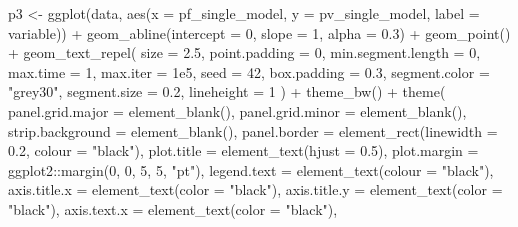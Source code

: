 \documentclass[
  11pt,
  oneside]{book}
\newenvironment{Shaded}{\begin{snugshade}}{\end{snugshade}}
\newcommand{\AttributeTok}[1]{\textcolor[rgb]{0.77,0.63,0.00}{#1}}
\newcommand{\DecValTok}[1]{\textcolor[rgb]{0.00,0.00,0.81}{#1}}
\newcommand{\FloatTok}[1]{\textcolor[rgb]{0.00,0.00,0.81}{#1}}
\newcommand{\FunctionTok}[1]{\textcolor[rgb]{0.00,0.00,0.00}{#1}}
\newcommand{\NormalTok}[1]{#1}
\newcommand{\OtherTok}[1]{\textcolor[rgb]{0.56,0.35,0.01}{#1}}
\newcommand{\SpecialCharTok}[1]{\textcolor[rgb]{0.00,0.00,0.00}{#1}}
\newcommand{\StringTok}[1]{\textcolor[rgb]{0.31,0.60,0.02}{#1}}
\begin{document}
\begin{Shaded}
\begin{Highlighting}[]
\NormalTok{p3 }\OtherTok{\textless{}{-}} \FunctionTok{ggplot}\NormalTok{(data, }\FunctionTok{aes}\NormalTok{(}\AttributeTok{x =}\NormalTok{ pf\_single\_model, }\AttributeTok{y =}\NormalTok{ pv\_single\_model, }\AttributeTok{label =}\NormalTok{ variable)) }\SpecialCharTok{+}
  \FunctionTok{geom\_abline}\NormalTok{(}\AttributeTok{intercept =} \DecValTok{0}\NormalTok{, }\AttributeTok{slope =} \DecValTok{1}\NormalTok{, }\AttributeTok{alpha =} \FloatTok{0.3}\NormalTok{) }\SpecialCharTok{+}
  \FunctionTok{geom\_point}\NormalTok{() }\SpecialCharTok{+}
  \FunctionTok{geom\_text\_repel}\NormalTok{(}
    \AttributeTok{size =} \FloatTok{2.5}\NormalTok{, }\AttributeTok{point.padding =} \DecValTok{0}\NormalTok{, }\AttributeTok{min.segment.length =} \DecValTok{0}\NormalTok{,}
    \AttributeTok{max.time =} \DecValTok{1}\NormalTok{, }\AttributeTok{max.iter =} \FloatTok{1e5}\NormalTok{, }\AttributeTok{seed =} \DecValTok{42}\NormalTok{, }\AttributeTok{box.padding =} \FloatTok{0.3}\NormalTok{,}
    \AttributeTok{segment.color =} \StringTok{"grey30"}\NormalTok{, }\AttributeTok{segment.size =} \FloatTok{0.2}\NormalTok{, }\AttributeTok{lineheight =} \DecValTok{1}
\NormalTok{  ) }\SpecialCharTok{+}
  \FunctionTok{theme\_bw}\NormalTok{() }\SpecialCharTok{+}
  \FunctionTok{theme}\NormalTok{(}
    \AttributeTok{panel.grid.major =} \FunctionTok{element\_blank}\NormalTok{(),}
    \AttributeTok{panel.grid.minor =} \FunctionTok{element\_blank}\NormalTok{(),}
    \AttributeTok{strip.background =} \FunctionTok{element\_blank}\NormalTok{(),}
    \AttributeTok{panel.border =} \FunctionTok{element\_rect}\NormalTok{(}\AttributeTok{linewidth =} \FloatTok{0.2}\NormalTok{, }\AttributeTok{colour =} \StringTok{"black"}\NormalTok{),}
    \AttributeTok{plot.title =} \FunctionTok{element\_text}\NormalTok{(}\AttributeTok{hjust =} \FloatTok{0.5}\NormalTok{),}
    \AttributeTok{plot.margin =}\NormalTok{ ggplot2}\SpecialCharTok{::}\FunctionTok{margin}\NormalTok{(}\DecValTok{0}\NormalTok{, }\DecValTok{0}\NormalTok{, }\DecValTok{5}\NormalTok{, }\DecValTok{5}\NormalTok{, }\StringTok{"pt"}\NormalTok{),}
    \AttributeTok{legend.text =} \FunctionTok{element\_text}\NormalTok{(}\AttributeTok{colour =} \StringTok{"black"}\NormalTok{),}
    \AttributeTok{axis.title.x =} \FunctionTok{element\_text}\NormalTok{(}\AttributeTok{color =} \StringTok{"black"}\NormalTok{),}
    \AttributeTok{axis.title.y =} \FunctionTok{element\_text}\NormalTok{(}\AttributeTok{color =} \StringTok{"black"}\NormalTok{),}
    \AttributeTok{axis.text.x =} \FunctionTok{element\_text}\NormalTok{(}\AttributeTok{color =} \StringTok{"black"}\NormalTok{),}

\end{Highlighting}
\end{Shaded}
\end{document}
